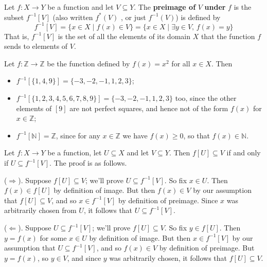 \begin{definition}
\label{defPreimage}
Let $f : X \to Y$ be a function and let $V \subseteq Y$. The \textbf{preimage of} $V$ \textbf{under} $f$ is the subset $f^{-1}[V]$  (also written $f^*(V)$ , or just $f^{-1}(V)$) is defined by
\[ f^{-1}[V] = \{ x \in X \mid f(x) \in V \} = \{ x \in X \mid \exists y \in V,\, f(x) = y \} \]
That is, $f^{-1}[V]$ is the set of all the elements of its domain $X$ that the function $f$ sends to elements of $V$.
\end{definition}

\begin{example}
Let $f : \mathbb{Z} \to \mathbb{Z}$ be the function defined by $f(x)=x^2$ for all $x \in X$. Then
\begin{itemize}
\item $f^{-1}[ \{ 1, 4, 9 \} ] = \{ -3, -2, -1, 1, 2, 3 \}$;
\item $f^{-1}[ \{ 1, 2, 3, 4, 5, 6, 7, 8, 9 \} ] =  \{ -3, -2, -1, 1, 2, 3 \}$ too, since the other elements of $[9]$ are not perfect squares, and hence not of the form $f(x)$ for $x \in \mathbb{Z}$;
\item $f^{-1}[\mathbb{N}] = \mathbb{Z}$, since for any $x \in \mathbb{Z}$ we have $f(x) \ge 0$, so that $f(x) \in \mathbb{N}$.
\end{itemize}
\end{example}

\begin{example}
Let $f : X \to Y$ be a function, let $U \subseteq X$ and let $V \subseteq Y$. Then $f[U] \subseteq V$ if and only if $U \subseteq f^{-1}[V]$. The proof is as follows.

($\Rightarrow$). Suppose $f[U] \subseteq V$; we'll prove $U \subseteq f^{-1}[V]$. So fix $x \in U$. Then $f(x) \in f[U]$ by definition of image. But then $f(x) \in V$ by our assumption that $f[U] \subseteq V$, and so $x \in f^{-1}[V]$ by definition of preimage. Since $x$ was arbitrarily chosen from $U$, it follows that $U \subseteq f^{-1}[V]$.

($\Leftarrow$). Suppose $U \subseteq f^{-1}[V]$; we'll prove $f[U] \subseteq V$. So fix $y \in f[U]$. Then $y=f(x)$ for some $x \in U$ by definition of image. But then $x \in f^{-1}[V]$ by our assumption that $U \subseteq f^{-1}[V]$, and so $f(x) \in V$ by definition of preimage. But $y=f(x)$, so $y \in V$, and since $y$ was arbitrarily chosen, it follows that $f[U] \subseteq V$.
\end{example}


